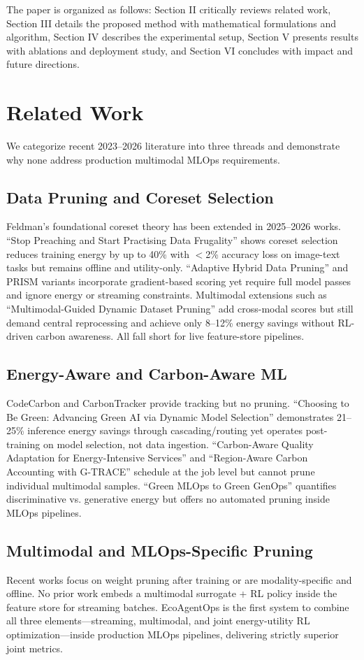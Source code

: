 The paper is organized as follows: Section II critically reviews related work, Section III details the proposed method with mathematical formulations and algorithm, Section IV describes the experimental setup, Section V presents results with ablations and deployment study, and Section VI concludes with impact and future directions.

\section{Related Work}
We categorize recent 2023--2026 literature into three threads and demonstrate why none address production multimodal MLOps requirements.

\subsection{Data Pruning and Coreset Selection}
Feldman's foundational coreset theory has been extended in 2025--2026 works. ``Stop Preaching and Start Practising Data Frugality'' \cite{b2} shows coreset selection reduces training energy by up to 40\% with $<$2\% accuracy loss on image-text tasks but remains offline and utility-only. ``Adaptive Hybrid Data Pruning'' and PRISM variants incorporate gradient-based scoring yet require full model passes and ignore energy or streaming constraints. Multimodal extensions such as ``Multimodal-Guided Dynamic Dataset Pruning'' \cite{b4} add cross-modal scores but still demand central reprocessing and achieve only 8--12\% energy savings without RL-driven carbon awareness. All fall short for live feature-store pipelines.

\subsection{Energy-Aware and Carbon-Aware ML}
CodeCarbon \cite{b10} and CarbonTracker provide tracking but no pruning. ``Choosing to Be Green: Advancing Green AI via Dynamic Model Selection'' \cite{b3} demonstrates 21--25\% inference energy savings through cascading/routing yet operates post-training on model selection, not data ingestion. ``Carbon-Aware Quality Adaptation for Energy-Intensive Services'' \cite{b7} and ``Region-Aware Carbon Accounting with G-TRACE'' schedule at the job level but cannot prune individual multimodal samples. ``Green MLOps to Green GenOps'' \cite{b8} quantifies discriminative vs. generative energy but offers no automated pruning inside MLOps pipelines.

\subsection{Multimodal and MLOps-Specific Pruning}
Recent works focus on weight pruning after training \cite{b6} or are modality-specific and offline. No prior work embeds a multimodal surrogate + RL policy inside the feature store for streaming batches. EcoAgentOps is the first system to combine all three elements---streaming, multimodal, and joint energy-utility RL optimization---inside production MLOps pipelines, delivering strictly superior joint metrics.

